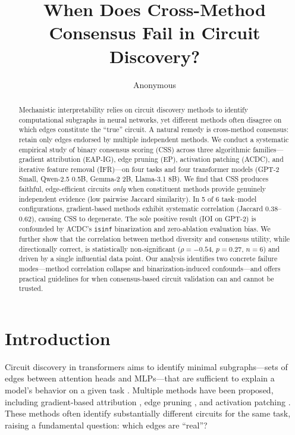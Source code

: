 \documentclass[11pt]{article}
\title{When Does Cross-Method Consensus Fail in Circuit Discovery?}
\author{
  Anonymous
}
\date{}
\begin{document}
\maketitle

\begin{abstract}
Mechanistic interpretability relies on circuit discovery methods to identify computational subgraphs in neural networks, yet different methods often disagree on which edges constitute the ``true'' circuit. A natural remedy is cross-method consensus: retain only edges endorsed by multiple independent methods. We conduct a systematic empirical study of binary consensus scoring (CSS) across three algorithmic families---gradient attribution (EAP-IG), edge pruning (EP), activation patching (ACDC), and iterative feature removal (IFR)---on four tasks and four transformer models (GPT-2 Small, Qwen-2.5 0.5B, Gemma-2 2B, Llama-3.1 8B). We find that CSS produces faithful, edge-efficient circuits \emph{only} when constituent methods provide genuinely independent evidence (low pairwise Jaccard similarity). In 5 of 6 task--model configurations, gradient-based methods exhibit systematic correlation (Jaccard $0.38$--$0.62$), causing CSS to degenerate. The sole positive result (IOI on GPT-2) is confounded by ACDC's \texttt{isinf} binarization and zero-ablation evaluation bias. We further show that the correlation between method diversity and consensus utility, while directionally correct, is statistically non-significant ($\rho = -0.54$, $p = 0.27$, $n=6$) and driven by a single influential data point. Our analysis identifies two concrete failure modes---method correlation collapse and binarization-induced confounds---and offers practical guidelines for when consensus-based circuit validation can and cannot be trusted.
\end{abstract}

\section{Introduction}

Circuit discovery in transformers aims to identify minimal subgraphs---sets of edges between attention heads and MLPs---that are sufficient to explain a model's behavior on a given task \citep{conmy2023towards,wang2023interpretability}. Multiple methods have been proposed, including gradient-based attribution \citep{syed2023attribution}, edge pruning \citep{li2024edge}, and activation patching \citep{conmy2023towards}. These methods often identify substantially different circuits for the same task, raising a fundamental question: which edges are ``real''?
\end{document}
